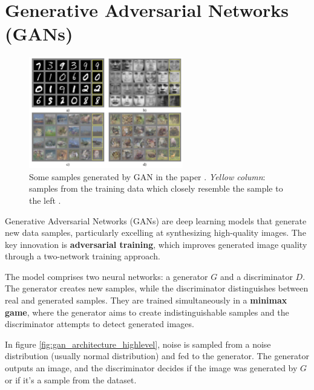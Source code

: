 \section{Generative Adversarial Networks (GANs)}
\label{sec:gan}

\begin{figure}
    \centering
    \includegraphics[width=0.6\textwidth]{images/gan/gan_samples.png}
    \caption{Some samples generated by GAN in the paper \cite{gan}. \textit{Yellow column}: samples from the training data which closely resemble the sample to the left \cite{gan}.}
\end{figure}

Generative Adversarial Networks (GANs) \cite{gan} are deep learning models that generate new data samples, particularly excelling at synthesizing high-quality images. The key innovation is \textbf{adversarial training}, which improves generated image quality through a two-network training approach.

The model comprises two neural networks: a generator $G$ and a discriminator $D$. The generator creates new samples, while the discriminator distinguishes between real and generated samples. They are trained simultaneously in a \textbf{minimax game}, where the generator aims to create indistinguishable samples and the discriminator attempts to detect generated images.



In figure \ref{fig:gan_architecture_highlevel}, noise is sampled from a noise distribution (usually normal distribution) and fed to the generator. The generator outputs an image, and the discriminator decides if the image was generated by $G$ or if it's a sample from the dataset.

